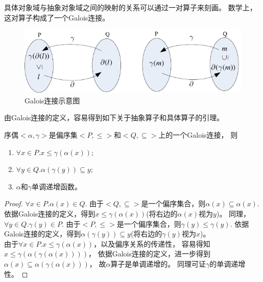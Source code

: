 

具体对象域与抽象对象域之间的映射的关系可以通过一对算子来刻画。
数学上，这对算子构成了一个Galois连接。



\begin{figure}[h]
\centering
\includegraphics{figures/chap04/galois.pdf}
\caption{Galois连接示意图}
\label{fig-galois}
\end{figure}

由Galois连接的定义，容易得到如下关于抽象算子和具体算子的引理。

\begin{lemma}
序偶$<\alpha, \gamma>$是偏序集$<P, \leq>$和$<Q, \subseteq>$上的一个Galois连接， 则
\begin{enumerate}
\item $\forall x\in P. x \leq \gamma(\alpha(x))$;
\item $\forall y\in Q. \alpha(\gamma(y)) \subseteq y$;
\item $\alpha$和$\gamma$单调递增函数。
\end{enumerate}
\end{lemma}
	
\begin{proof}
$\forall x\in P. \alpha(x) \in Q$. 
由于$<Q, \subseteq>$是一个偏序集合，则$\alpha(x) \subseteq \alpha(x)$.
依据Galois连接的定义，得到$ x \leq \gamma(\alpha(x))$(将右边的$\alpha(x)$视为$y$)。
同理，$\forall y \in Q. \gamma(y) \in P$.
由于$<P, \leq>$是一个偏序集合，则$\gamma(y) \leq \gamma(y)$.
依据Galois连接的定义，得到$\alpha(\gamma(y)) \subseteq y$(将右边的$\gamma(y)$视为$x$)。\\
由于$\forall x\in P. x\leq \gamma(\alpha(x))$，以及偏序关系的传递性，
容易得知$ x\leq \gamma(\alpha(\gamma(\alpha(x))))$，
依据Galois连接的定义，进一步得到$\alpha(x)\subseteq \alpha(\gamma(\alpha(x)))$，
故$\alpha$算子是单调递增的。
同理可证$\gamma$的单调递增性。
\end{proof}



